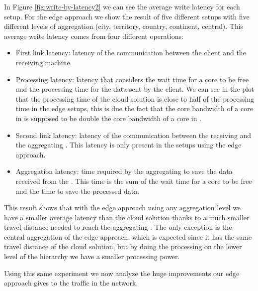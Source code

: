 In Figure \ref{fig:write-by-latency2} we can see the average write latency for each setup. For the edge approach we show the result of five different setups with five different levels of aggregation (city, territory, country, continent, central).
This average write latency comes from four different operations:
\begin{itemize}
    \item First link latency: latency of the communication between the client and the receiving machine.
    \item Processing latency: latency that considers the wait time for a core to be free and the processing time for the data sent by the client. We can see in the plot that the processing time of the cloud solution is close to half of the processing time in the edge setups, this is due the fact that the core bandwidth of a core in  is supposed to be double the core bandwidth of a core in .
    \item Second link latency: latency of the communication between the receiving   and the aggregating . This latency is only present in the setups using the edge approach.
    \item Aggregation latency: time required by the aggregating  to save the data received from the . This time is the sum of the wait time for a core to be free and the time to save the processed data.
\end{itemize}

This result shows that with the edge approach using any aggregation level we have a smaller average latency than the cloud solution thanks to a much smaller travel distance needed to reach the aggregating . The only exception is the central aggregation of the edge approach, which is expected since it has the same travel distance of the cloud solution, but by doing the processing on the lower level of the hierarchy we have a smaller processing power.

Using this same experiment we now analyze the huge improvements our edge approach gives to the traffic in the network.

